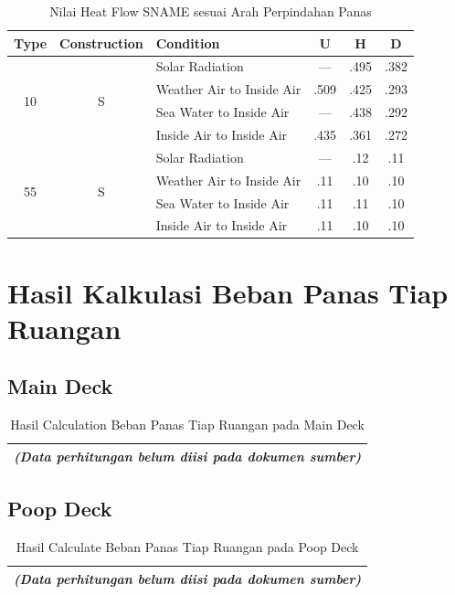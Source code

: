 \documentclass[12pt,a4paper,twoside,openright]{book}
\theoremstyle{definition}
\theoremstyle{plain}
\theoremstyle{remark}
\begin{document}
\begin{table}[H]
\centering
\caption{Nilai Heat Flow SNAME sesuai Arah Perpindahan Panas}
\begin{tabular}{|c|c|l|c|c|c|}
\hline
\rowcolor{tableheader}
\textbf{Type} & \textbf{Construction} & \textbf{Condition} & \textbf{U} & \textbf{H} & \textbf{D} \\
\hline
\multirow{4}{*}{10} & \multirow{4}{*}{S} & Solar Radiation & --- & .495 & .382 \\
\cline{3-6}
 & & Weather Air to Inside Air & .509 & .425 & .293 \\
\cline{3-6}
 & & Sea Water to Inside Air & --- & .438 & .292 \\
\cline{3-6}
 & & Inside Air to Inside Air & .435 & .361 & .272 \\
\hline
\multirow{4}{*}{55} & \multirow{4}{*}{S} & Solar Radiation & --- & .12 & .11 \\
\cline{3-6}
 & & Weather Air to Inside Air & .11 & .10 & .10 \\
\cline{3-6}
 & & Sea Water to Inside Air & .11 & .11 & .10 \\
\cline{3-6}
 & & Inside Air to Inside Air & .11 & .10 & .10 \\
\hline
\end{tabular}
\end{table}

\section{Hasil Kalkulasi Beban Panas Tiap Ruangan}

\subsection{Main Deck}

\begin{table}[H]
\centering
\caption{Hasil Calculation Beban Panas Tiap Ruangan pada Main Deck}
\begin{tabular}{|c|}
\hline
\textit{(Data perhitungan belum diisi pada dokumen sumber)} \\
\hline
\end{tabular}
\end{table}

\subsection{Poop Deck}

\begin{table}[H]
\centering
\caption{Hasil Calculate Beban Panas Tiap Ruangan pada Poop Deck}
\begin{tabular}{|c|}
\hline
\textit{(Data perhitungan belum diisi pada dokumen sumber)} \\
\hline
\end{tabular}
\end{table}
\end{document}
